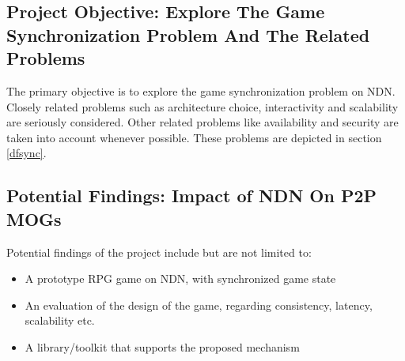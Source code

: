 \documentclass{article}
\begin{document}
\subsection{Project Objective: Explore The Game Synchronization Problem And The Related Problems}
The primary objective is to explore the game synchronization problem on NDN. Closely related problems such as architecture choice, interactivity and scalability are seriously considered. Other related problems like availability and security are taken into account whenever possible. These problems are depicted in section \ref{dfsync}.




\subsection{Potential Findings: Impact of NDN On P2P MOGs}
Potential findings of the project include but are not limited to:
\begin{itemize}
\item A prototype RPG game on NDN, with synchronized game state
\item An evaluation of the design of the game, regarding consistency, latency, scalability etc.
\item A library/toolkit that supports the proposed mechanism
\end{itemize}
\end{document}
